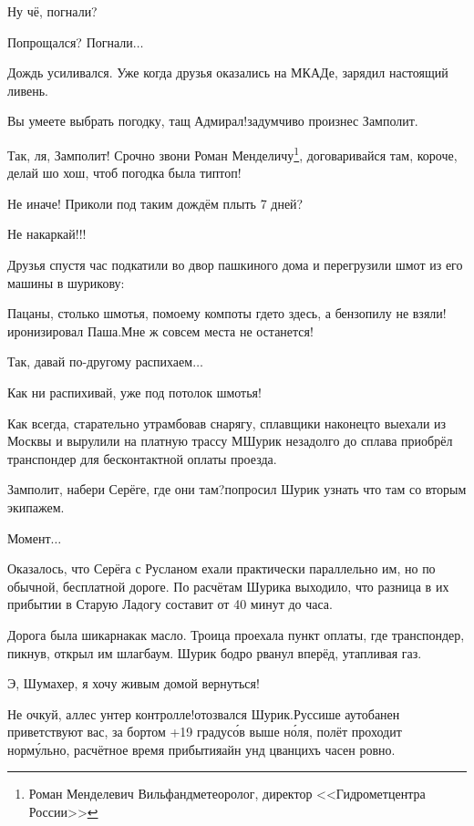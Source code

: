 \diagdash Ну чё, погнали?

\diagdash Попрощался? Погнали$\ldots$

Дождь усиливался. Уже когда друзья оказались на МКАДе, зарядил настоящий ливень.

\diagdash Вы умеете выбрать погодку, тащ Адмирал!\mdash задумчиво произнес Замполит. 

\diagdash Так, ля, Замполит! Срочно звони Роман Менделичу\footnote{Роман Менделевич Вильфанд\mdash метеоролог, директор <<Гидрометцентра России>>}, договаривайся там, короче, делай шо хош, чтоб погодка была тип\sdash топ!

\diagdash Не иначе! Приколи под таким дождём плыть 7 дней?

\diagdash Не накаркай!!!

Друзья спустя час подкатили во двор пашкиного дома и перегрузили шмот из его машины в шурикову:

\diagdash Пацаны, столько шмотья, по\sdash моему компоты где\sdash то здесь, а бензопилу не взяли!\mdash иронизировал Паша.\mdash Мне ж совсем места не останется!

\diagdash Так, давай по-другому распихаем$\ldots$

\diagdash Как ни распихивай, уже под потолок шмотья!

Как всегда, старательно утрамбовав снарягу, сплавщики наконец\sdash то выехали из Москвы и вырулили на платную трассу М\mdash Шурик незадолго до сплава приобрёл транспондер для бесконтактной оплаты проезда.

\diagdash Замполит, набери Серёге, где они там?\mdash попросил Шурик узнать что там со вторым экипажем.

\diagdash Момент$\ldots$

Оказалось, что Серёга с Русланом ехали практически параллельно им, но по обычной, бесплатной дороге. По расчётам Шурика выходило, что разница в их прибытии в Старую Ладогу составит от 40 минут до часа.

Дорога была шикарна\mdash как масло. Троица проехала пункт оплаты, где транспондер, пикнув, открыл им шлагбаум. Шурик бодро рванул вперёд, утапливая газ. 

\diagdash Э, Шумахер, я хочу живым домой вернуться!

\diagdash Не очкуй, аллес унтер контролле!\mdash отозвался Шурик.\mdash Руссише аутобанен приветствуют вас, за бортом +19 градус\'{о}в выше н\'{о}ля, полёт проходит норм\'{у}льно, расчётное время прибытия\mdash айн унд цванцихъ часен ровно.

